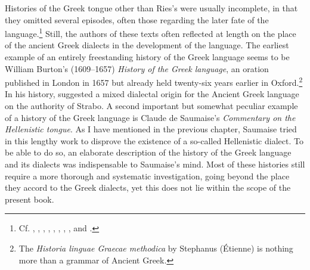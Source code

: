 Histories of the Greek tongue other than Ries’s were usually incomplete, in that they omitted several episodes, often those regarding the later fate of the language.\footnote{Cf. \citet[267--464]{Saumaise1643a}, \citet{Burton1657}, \citet{Lagerloof1685}, \citet{Rodigast1685}, \citet{Eling1691}, \citet{Florinus1707}, \citet{Reinhard1724}, \citet{Munthe1748}, and \citet{Harles1778}.} Still, the authors of these texts often reflected at length on the place of the ancient Greek dialects in the development of the language. The earliest example of an entirely freestanding history of the Greek language seems to be William Burton’s (1609–1657) \textit{History of the Greek language}, an oration published in London in 1657 but already held twenty-six years earlier in Oxford.\footnote{The \textit{Historia linguae Graecae methodica} by Stephanus (Étienne) \citet{Simon1615} is nothing more than a grammar of Ancient Greek.} In his history, \citet[27]{Burton1657} suggested a mixed dialectal origin for the Ancient Greek language on the authority of Strabo. A second important but somewhat peculiar example of a history of the Greek language is Claude de Saumaise’s \textit{Commentary on the Hellenistic tongue}. As I have mentioned in the previous chapter, Saumaise tried in this lengthy work to disprove the existence of a so-called Hellenistic dialect. To be able to do so, an elaborate description of the history of the Greek language and its dialects was indispensable to Saumaise’s mind. Most of these histories still require a more thorough and systematic investigation, going beyond the place they accord to the Greek dialects, yet this does not lie within the scope of the present book.

